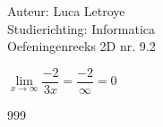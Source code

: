 \documentclass[a4paper]{article}
\begin{document}
  
\noindent \large Auteur: Luca Letroye \\
\noindent \large Studierichting: Informatica\\
\noindent \large Oefeningenreeks 2D nr. 9.2\\

\medskip

\normalsize

$\lim\limits_{x\rightarrow \infty} \dfrac{-2}{3x} = \dfrac{-2}{\infty} = 0$




\begin{thebibliography}{999}
\end{thebibliography}
\end{document}
